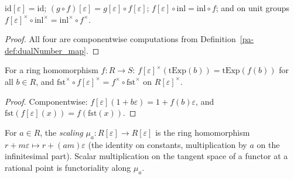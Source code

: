 \begin{lemma}
  \label{pa-lem:dualNumber_map_functorial}
  \leanok

  \(\mathrm{id}[\varepsilon] = \mathrm{id}\);
  \((g \circ f)[\varepsilon] = g[\varepsilon] \circ f[\varepsilon]\);
  \(f[\varepsilon] \circ \mathrm{inl} = \mathrm{inl} \circ f\); and on unit groups
  \(f[\varepsilon]^\times \circ \mathrm{inl}^\times = \mathrm{inl}^\times \circ
  f^\times\).
\end{lemma}
\begin{proof}
  \leanok
  All four are componentwise computations from Definition~\ref{pa-def:dualNumber_map}.
\end{proof}

\begin{lemma}
  \label{pa-lem:truncExp_naturality}
  \leanok

  For a ring homomorphism \(f : R \to S\):
  \(f[\varepsilon]^\times(\mathrm{tExp}(b)) = \mathrm{tExp}(f(b))\) for all
  \(b \in R\), and
  \(\mathrm{fst}^\times \circ f[\varepsilon]^\times = f^\times \circ
  \mathrm{fst}^\times\) on \(R[\varepsilon]^\times\).
\end{lemma}
\begin{proof}
  \leanok
  Componentwise: \(f[\varepsilon](1 + b\varepsilon) = 1 + f(b)\varepsilon\), and
  \(\mathrm{fst}(f[\varepsilon](x)) = f(\mathrm{fst}(x))\).
\end{proof}

\begin{definition}
  \label{pa-def:mumford_scaling}
  \leanok

  For \(a \in R\), the \emph{scaling} \(\mu_a : R[\varepsilon] \to R[\varepsilon]\) is
  the ring homomorphism \(r + m\varepsilon \mapsto r + (am)\varepsilon\) (the identity
  on constants, multiplication by \(a\) on the infinitesimal part). Scalar
  multiplication on the tangent space of a functor at a rational point is
  functoriality along \(\mu_a\).
\end{definition}


